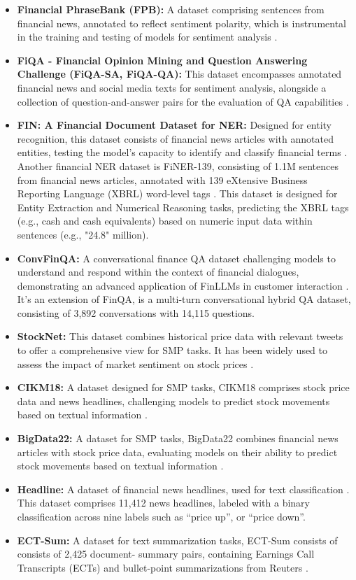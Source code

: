 \begin{itemize}
	\item \textbf{Financial PhraseBank (FPB):} A dataset comprising sentences from financial news, annotated to reflect sentiment polarity, which is instrumental in the training and testing of models for sentiment analysis \textcite{malo2014good}.
	\item \textbf{FiQA - Financial Opinion Mining and Question Answering Challenge (FiQA-SA, FiQA-QA):} This dataset encompasses annotated financial news and social media texts for sentiment analysis, alongside a collection of question-and-answer pairs for the evaluation of QA capabilities \textcite{maia2018www}.
	\item \textbf{FIN: A Financial Document Dataset for NER:} {Designed for entity recognition, this dataset consists of financial news articles with annotated entities, testing the model's capacity to identify and classify financial terms \textcite{alvarado2015domain}.
		      Another financial NER dataset is FiNER-139, consisting of 1.1M sentences from financial news articles, annotated with 139 eXtensive Business Reporting Language (XBRL) word-level tags \textcite{loukas2022finer}. This dataset is designed for Entity Extraction and Numerical Reasoning tasks, predicting the XBRL tags (e.g., cash and cash equivalents) based on numeric input data within sentences (e.g., "24.8" million).}
	\item \textbf{ConvFinQA:} {A conversational finance QA dataset challenging models to understand and respond within the context of financial dialogues, demonstrating an advanced application of FinLLMs in customer interaction \textcite{chen2022convfinqa}. It's an extension of FinQA, is a multi-turn conversational hybrid QA dataset, consisting of 3,892 conversations with 14,115 questions.}
	\item \textbf{StockNet:} {This dataset combines historical price data with relevant tweets to offer a comprehensive view for SMP tasks. It has been widely used to assess the impact of market sentiment on stock prices \textcite{xu2018stock}.}
	\item \textbf{CIKM18:} {A dataset designed for SMP tasks, CIKM18 comprises stock price data and news headlines, challenging models to predict stock movements based on textual information \textcite{wu2018hybrid}.}
	\item \textbf{BigData22:} {A dataset for SMP tasks, BigData22 combines financial news articles with stock price data, evaluating models on their ability to predict stock movements based on textual information \textcite{soun2022accurate}.}
	\item \textbf{Headline:} {A dataset of financial news headlines, used for text classification \textcite{sinha2021impact}. This dataset comprises 11,412 news headlines, labeled with a binary classification across nine labels such as “price up”, or “price down”.}
	\item \textbf{ECT-Sum:} {A dataset for text summarization tasks, ECT-Sum consists of consists of 2,425 document- summary pairs, containing Earnings Call Transcripts (ECTs) and bullet-point summarizations from Reuters \textcite{mukherjee2022ectsum}.}
\end{itemize}

